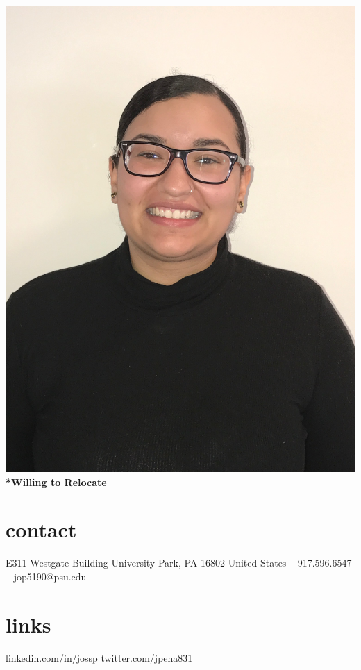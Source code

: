 \documentclass[]{cv-style}          %
\begin{document}
\lastupdated

\begin{aside}
\includegraphics[width=\linewidth, angle=270]{IMG_2797}
%
\textbf{*Willing to Relocate}
\section{contact}
E311 Westgate Building
University Park, PA 16802
United States
~
917.596.6547
~
jop5190@psu.edu
%
\section{links}
linkedin.com/in/jossp
twitter.com/jpena831
%
\end{aside}
\end{document}
